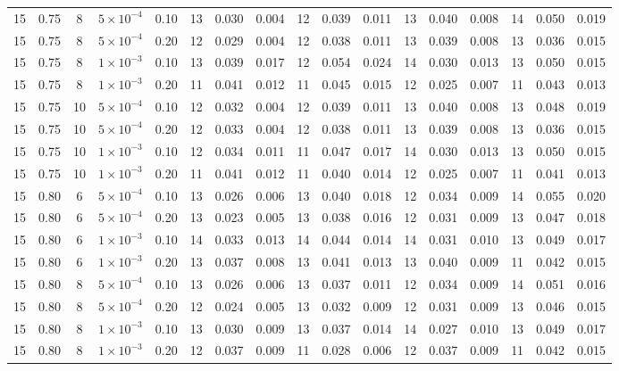 \begin{longtable}{c c c c c c c c c c c c c c c c c }
15 & 0.75 & 8 & $5{\times}10^{-4}$ & 0.10 & 13 & 0.030 & 0.004 & 12 & 0.039 & 0.011 & 13 & 0.040 & 0.008 & 14 & 0.050 & 0.019 \\
15 & 0.75 & 8 & $5{\times}10^{-4}$ & 0.20 & 12 & 0.029 & 0.004 & 12 & 0.038 & 0.011 & 13 & 0.039 & 0.008 & 13 & 0.036 & 0.015 \\
15 & 0.75 & 8 & $1{\times}10^{-3}$ & 0.10 & 13 & 0.039 & 0.017 & 12 & 0.054 & 0.024 & 14 & 0.030 & 0.013 & 13 & 0.050 & 0.015 \\
15 & 0.75 & 8 & $1{\times}10^{-3}$ & 0.20 & 11 & 0.041 & 0.012 & 11 & 0.045 & 0.015 & 12 & 0.025 & 0.007 & 11 & 0.043 & 0.013 \\
15 & 0.75 & 10 & $5{\times}10^{-4}$ & 0.10 & 12 & 0.032 & 0.004 & 12 & 0.039 & 0.011 & 13 & 0.040 & 0.008 & 13 & 0.048 & 0.019 \\
15 & 0.75 & 10 & $5{\times}10^{-4}$ & 0.20 & 12 & 0.033 & 0.004 & 12 & 0.038 & 0.011 & 13 & 0.039 & 0.008 & 13 & 0.036 & 0.015 \\
15 & 0.75 & 10 & $1{\times}10^{-3}$ & 0.10 & 12 & 0.034 & 0.011 & 11 & 0.047 & 0.017 & 14 & 0.030 & 0.013 & 13 & 0.050 & 0.015 \\
15 & 0.75 & 10 & $1{\times}10^{-3}$ & 0.20 & 11 & 0.041 & 0.012 & 11 & 0.040 & 0.014 & 12 & 0.025 & 0.007 & 11 & 0.041 & 0.013 \\
15 & 0.80 & 6 & $5{\times}10^{-4}$ & 0.10 & 13 & 0.026 & 0.006 & 13 & 0.040 & 0.018 & 12 & 0.034 & 0.009 & 14 & 0.055 & 0.020 \\
15 & 0.80 & 6 & $5{\times}10^{-4}$ & 0.20 & 13 & 0.023 & 0.005 & 13 & 0.038 & 0.016 & 12 & 0.031 & 0.009 & 13 & 0.047 & 0.018 \\
15 & 0.80 & 6 & $1{\times}10^{-3}$ & 0.10 & 14 & 0.033 & 0.013 & 14 & 0.044 & 0.014 & 14 & 0.031 & 0.010 & 13 & 0.049 & 0.017 \\
15 & 0.80 & 6 & $1{\times}10^{-3}$ & 0.20 & 13 & 0.037 & 0.008 & 13 & 0.041 & 0.013 & 13 & 0.040 & 0.009 & 11 & 0.042 & 0.015 \\
15 & 0.80 & 8 & $5{\times}10^{-4}$ & 0.10 & 13 & 0.026 & 0.006 & 13 & 0.037 & 0.011 & 12 & 0.034 & 0.009 & 14 & 0.051 & 0.016 \\
15 & 0.80 & 8 & $5{\times}10^{-4}$ & 0.20 & 12 & 0.024 & 0.005 & 13 & 0.032 & 0.009 & 12 & 0.031 & 0.009 & 13 & 0.046 & 0.015 \\
15 & 0.80 & 8 & $1{\times}10^{-3}$ & 0.10 & 13 & 0.030 & 0.009 & 13 & 0.037 & 0.014 & 14 & 0.027 & 0.010 & 13 & 0.049 & 0.017 \\
15 & 0.80 & 8 & $1{\times}10^{-3}$ & 0.20 & 12 & 0.037 & 0.009 & 11 & 0.028 & 0.006 & 12 & 0.037 & 0.009 & 11 & 0.042 & 0.015 \\

\end{longtable}
